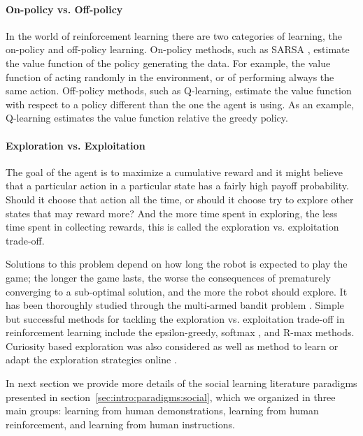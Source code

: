 \paragraph{On-policy vs. Off-policy} In the world of reinforcement learning there are two categories of learning, the on-policy and off-policy learning. On-policy methods, such as SARSA \cite{rummery1994line}, estimate the value function of the policy generating the data. For example, the value function of acting randomly in the environment, or of performing always the same action. Off-policy methods, such as Q-learning, estimate the value function with respect to a policy different than the one the agent is using. As an example, Q-learning \cite{sutton1998reinforcement} estimates the value function relative the greedy policy.

\paragraph{Exploration vs. Exploitation} 
The goal of the agent is to maximize a cumulative reward and it might believe that a particular action in a particular state has a fairly high payoff probability. Should it choose that action all the time, or should it choose try to explore other states that may reward more? And the more time spent in exploring, the less time spent in collecting rewards, this is called the exploration vs. exploitation trade-off. 

Solutions to this problem depend on how long the robot is expected to play the game; the longer the game lasts, the worse the consequences of prematurely converging to a sub-optimal solution, and the more the robot should explore. It has been thoroughly studied through the multi-armed bandit problem \cite{berry1985bandit,audibert2009exploration}. Simple but successful methods for tackling the exploration vs. exploitation trade-off in reinforcement learning include the epsilon-greedy, softmax \cite{sutton1998reinforcement}, and R-max \cite{brafman2003r} methods. Curiosity based exploration \cite{schmidhuber1991curious,storck1995reinforcement,barto2004intrinsically,singh2005intrinsically} was also considered as well as method to learn or adapt the exploration strategies online \cite{mahmood2012tuning,Hester13aamas}.

\transition

In next section we provide more details of the social learning literature paradigms presented in section~\ref{sec:intro:paradigms:social}, which we organized in three main groups: learning from human demonstrations, learning from human reinforcement, and learning from human instructions.

